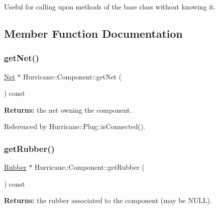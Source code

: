 Useful for calling upon methods of the base class without knowing it. 

\subsection{Member Function Documentation}
\mbox{\label{classHurricane_1_1Component_a1556ef77d6b89bfc17698d52ebde9791}} 
\subsubsection{\texorpdfstring{get\+Net()}{getNet()}}
{\footnotesize\ttfamily \hyperlink{classHurricane_1_1Net}{Net} $\ast$ Hurricane\+::\+Component\+::get\+Net (\begin{DoxyParamCaption}{ }\end{DoxyParamCaption}) const\hspace{0.3cm}{\ttfamily [inline]}}

{\bfseries Returns\+:} the net owning the component. 

Referenced by Hurricane\+::\+Plug\+::is\+Connected().

\mbox{\label{classHurricane_1_1Component_ab701515debfdf1bf4142d4d917aaab1d}} 
\subsubsection{\texorpdfstring{get\+Rubber()}{getRubber()}}
{\footnotesize\ttfamily \hyperlink{classHurricane_1_1Rubber}{Rubber} $\ast$ Hurricane\+::\+Component\+::get\+Rubber (\begin{DoxyParamCaption}{ }\end{DoxyParamCaption}) const\hspace{0.3cm}{\ttfamily [inline]}}

{\bfseries Returns\+:} the rubber associated to the component (may be N\+U\+LL). \mbox{\label{classHurricane_1_1Component_a19f06d7cad163bab3b97a13f4736c9d1}} 
